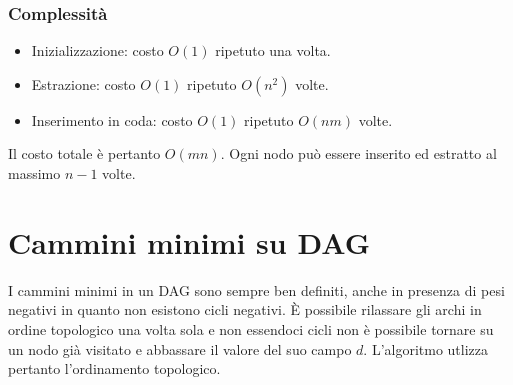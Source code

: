 \subsubsection{Complessit\`a}
\begin{itemize}
	\item Inizializzazione: costo $O(1)$ ripetuto una volta.
	\item Estrazione: costo $O(1)$ ripetuto $O(n^2)$ volte.
	\item Inserimento in coda: costo $O(1)$ ripetuto $O(nm)$ volte.
\end{itemize}
Il costo totale \`e pertanto $O(mn)$. Ogni nodo pu\`o essere inserito ed estratto al massimo $n-1$ volte.
\section{Cammini minimi su DAG}
I cammini minimi in un DAG sono sempre ben definiti, anche in presenza di pesi negativi in quanto non esistono cicli negativi. \`E possibile rilassare gli archi in ordine topologico una
volta sola e non essendoci cicli non \`e possibile tornare su un nodo gi\`a visitato e abbassare il valore del suo campo $d$. L'algoritmo utlizza pertanto l'ordinamento topologico.\\
